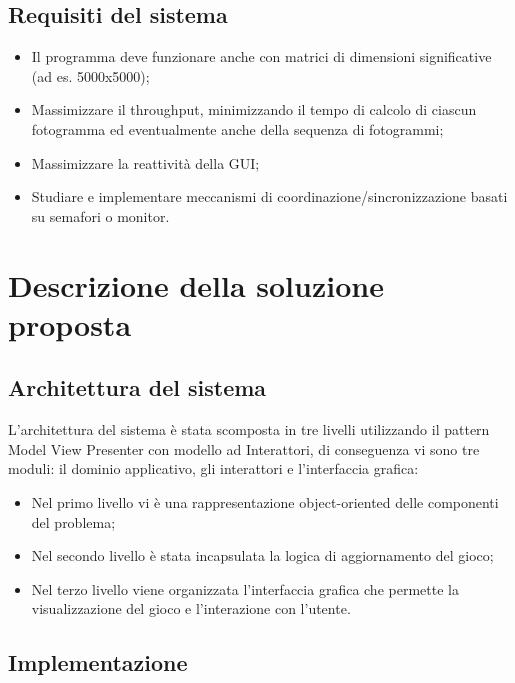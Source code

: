 ﻿\documentclass[a4paper]{article}
\begin{document}
\subsection{Requisiti del sistema}\label{requisiti-del-sistema}

\begin{itemize}
\item
  Il programma deve funzionare anche con matrici di dimensioni significative (ad es. 5000x5000);
\item
  Massimizzare il throughput, minimizzando il tempo di calcolo di ciascun fotogramma ed eventualmente anche della sequenza di fotogrammi;
\item
  Massimizzare la reattività della GUI;
\item
  Studiare e implementare meccanismi di coordinazione/sincronizzazione basati su semafori o monitor.
\end{itemize}

\section{Descrizione della soluzione proposta}\label{descrizione-della-soluzione-proposta}

\subsection{Architettura del sistema}\label{architettura-del-sistema}

L'architettura del sistema è stata scomposta in tre livelli utilizzando il pattern Model View Presenter con modello ad Interattori, di conseguenza vi sono tre moduli: il dominio applicativo, gli interattori e l'interfaccia grafica:

\begin{itemize}
\item
  Nel primo livello vi è una rappresentazione object-oriented delle componenti del problema;
\item
  Nel secondo livello è stata incapsulata la logica di aggiornamento del gioco;
\item
  Nel terzo livello viene organizzata l'interfaccia grafica che permette la visualizzazione del gioco e l'interazione con l'utente.
\end{itemize}

\subsection{Implementazione}\label{implementazione}
\end{document}
